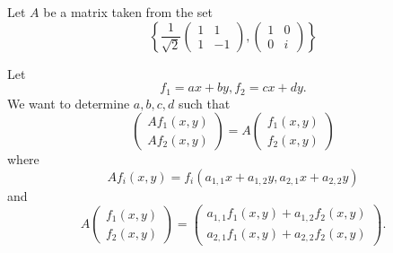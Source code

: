 \documentclass[10pt,a4paper]{article}
\begin{document}
Let $A$ be a matrix taken from the set
\[
\left\lbrace \frac{1}{\sqrt{2}}
\left(
\begin{array}{rr}
1  & 1 \\
1 & -1
\end{array} \right),
\left(
\begin{array}{rr}
1  & 0 \\
0 & i
\end{array} \right)
\right\rbrace 
\]

Let 
\[
f_1 = ax + by, f_2 = cx + dy.
\]
We want to determine $a,b,c,d$ such that
\[
\left(
\begin{array}{cc}
A f_1 (x,y) \\
A f_2 (x,y)
\end{array}
\right)
=
A \left(
\begin{array}{cc}
f_1 (x,y) \\
f_2 (x,y)
\end{array}
\right)
\]
where
\[
A f_i(x,y) = f_i (a_{1,1}x + a_{1,2}y,a_{2,1}x+a_{2,2}y)
\]
and
\[
A \left(
\begin{array}{cc}
f_1 (x,y) \\
f_2 (x,y)
\end{array}
\right) = \left(
\begin{array}{cc}
a_{1,1} f_1 (x,y) + a_{1,2} f_2 (x,y) \\
a_{2,1} f_1 (x,y) + a_{2,2} f_2 (x,y) 
\end{array}
\right).
\]
\end{document}
